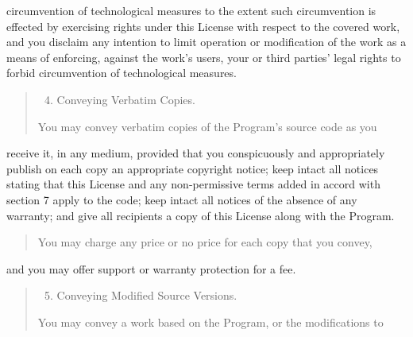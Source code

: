 \documentclass[letterpaper,10pt,english]{sphinxmanual}
\begin{document}
circumvention of technological measures to the extent such circumvention
is effected by exercising rights under this License with respect to
the covered work, and you disclaim any intention to limit operation or
modification of the work as a means of enforcing, against the work’s
users, your or third parties’ legal rights to forbid circumvention of
technological measures.
\begin{quote}
\begin{enumerate}
\setcounter{enumi}{3}
\item {} 
Conveying Verbatim Copies.

\end{enumerate}

You may convey verbatim copies of the Program’s source code as you
\end{quote}

receive it, in any medium, provided that you conspicuously and
appropriately publish on each copy an appropriate copyright notice;
keep intact all notices stating that this License and any
non-permissive terms added in accord with section 7 apply to the code;
keep intact all notices of the absence of any warranty; and give all
recipients a copy of this License along with the Program.
\begin{quote}

You may charge any price or no price for each copy that you convey,
\end{quote}

and you may offer support or warranty protection for a fee.
\begin{quote}
\begin{enumerate}
\setcounter{enumi}{4}
\item {} 
Conveying Modified Source Versions.

\end{enumerate}

You may convey a work based on the Program, or the modifications to
\end{quote}
\end{document}
